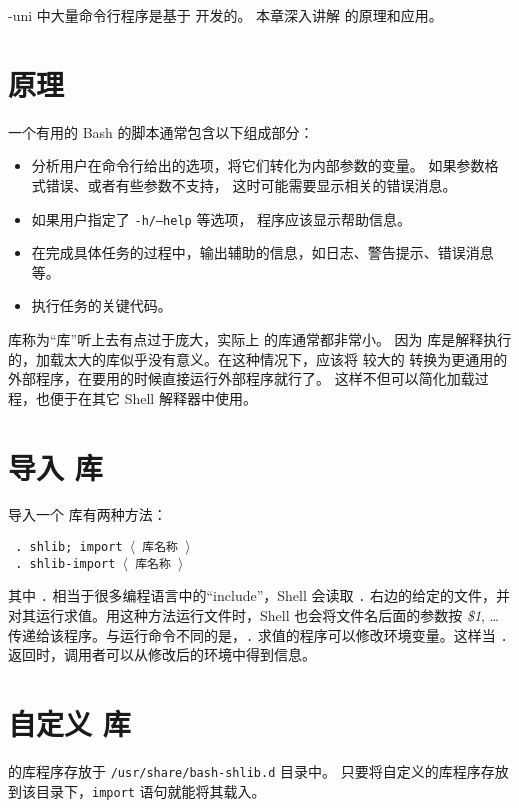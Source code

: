     \boDz-uni 中大量命令行程序是基于 \shlib 开发的。
    本章深入讲解 \shlib 的原理和应用。

\section{\shlib 原理}

    一个有用的 Bash 的脚本通常包含以下组成部分：

    \begin{itemize}
        \item 分析用户在命令行给出的选项，将它们转化为内部参数的变量。
            如果参数格式错误、或者有些参数不支持，
            这时可能需要显示相关的错误消息。

        \item 如果用户指定了 \texttt{-h/--help} 等选项，
            程序应该显示帮助信息。

        \item 在完成具体任务的过程中，输出辅助的信息，如日志、警告提示、错误消息等。

        \item 执行任务的关键代码。
    \end{itemize}

    \shlib 库称为``库''听上去有点过于庞大，实际上 \shlib 的库通常都非常小。
    因为 \shlib 库是解释执行的，加载太大的库似乎没有意义。在这种情况下，应该将
    较大的 \shlib 转换为更通用的外部程序，在要用的时候直接运行外部程序就行了。
    这样不但可以简化加载过程，也便于在其它 Shell 解释器中使用。

\section{导入 \shlib 库}

    导入一个 \shlib 库有两种方法：

    \texttt{ . shlib; import $\langle$ 库名称 $\rangle$ } \\
    \texttt{ . shlib-import $\langle$ 库名称 $\rangle$ }

    其中 \texttt{.} 相当于很多编程语言中的``include''，Shell 会读取 \texttt{.} 右边的给定的文件，并对其运行求值。用这种方法运行文件时，Shell 也会将文件名后面的参数按 \emph{\$1}, \ldots 传递给该程序。与运行命令不同的是，\texttt{.} 求值的程序可以修改环境变量。这样当 \texttt{.} 返回时，调用者可以从修改后的环境中得到信息。

\section{自定义 \shlib 库}

    \shlib 的库程序存放于 \texttt{/usr/share/bash-shlib.d} 目录中。
    只要将自定义的库程序存放到该目录下，\texttt{import} 语句就能将其载入。
